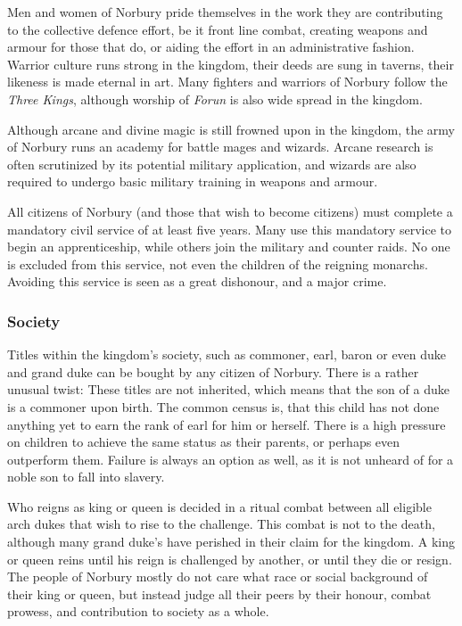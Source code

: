 Men and women of Norbury pride themselves in the work they are contributing to
the collective defence effort, be it front line combat, creating weapons and
armour for those that do, or aiding the effort in an administrative
fashion. Warrior culture runs strong in the kingdom, their deeds are sung in
taverns, their likeness is made eternal in art. Many fighters and warriors of
Norbury follow the \emph{Three Kings}, although worship of \emph{Forun} is also
wide spread in the kingdom.

Although arcane and divine magic is still frowned upon in the kingdom, the army
of Norbury runs an academy for battle mages and wizards. Arcane research is
often scrutinized by its potential military application, and wizards are also
required to undergo basic military training in weapons and armour.

All citizens of Norbury (and those that wish to become citizens) must complete
a mandatory civil service of at least five years. Many use this mandatory
service to begin an apprenticeship, while others join the military and counter
raids. No one is excluded from this service, not even the children of the
reigning monarchs. Avoiding this service is seen as a great dishonour, and a
major crime.

\subsubsection{Society}

Titles within the kingdom's society, such as commoner, earl, baron or even
duke and grand duke can be bought by any citizen of Norbury. There is a rather
unusual twist: These titles are not inherited, which means that the son of a
duke is a commoner upon birth. The common census is, that this child has not
done anything yet to earn the rank of earl for him or herself. There is a high
pressure on children to achieve the same status as their parents, or perhaps
even outperform them. Failure is always an option as well, as it is not
unheard of for a noble son to fall into slavery.

Who reigns as king or queen is decided in a ritual combat between all eligible
arch dukes that wish to rise to the challenge. This combat is not to the
death, although many grand duke's have perished in their claim for the
kingdom. A king or queen reins until his reign is challenged by another, or
until they die or resign. The people of Norbury mostly do not care what race
or social background of their king or queen, but instead judge all their peers
by their honour, combat prowess, and contribution to society as a whole.

